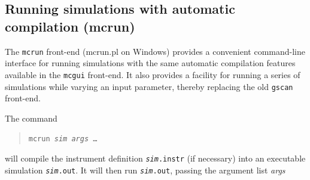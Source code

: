 \subsection{Running simulations with automatic compilation (mcrun)}
\label{s:mcrun}

The \verb+mcrun+ front-end (mcrun.pl on Windows) provides a convenient command-line
interface for running simulations with the same automatic compilation
features available in the \verb+mcgui+ front-end. It also provides a
facility for running a series of simulations while varying an input
parameter, thereby replacing the old \verb+gscan+ front-end.

The command
\begin{quote}
  \texttt{mcrun {\it sim} {\it args\/} \ldots}
\end{quote}
will compile the instrument definition \texttt{{\it sim}.instr} (if
necessary) into an executable simulation \texttt{{\it sim}.out}. It
will then run \texttt{{\it sim}.out}, passing the argument list {\it
  args}

